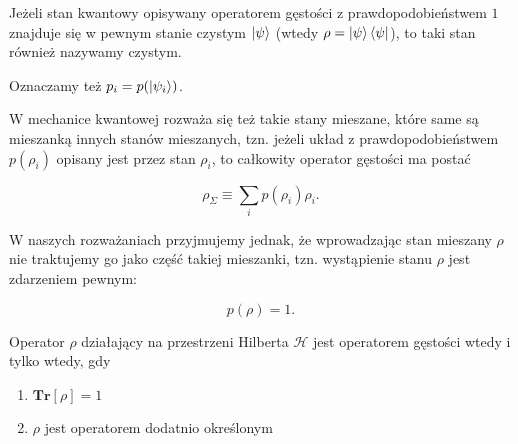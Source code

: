 \begin{remark}
    Jeżeli stan kwantowy opisywany operatorem gęstości z prawdopodobieństwem $1$ znajduje się w pewnym stanie czystym $\ket{\psi}$ (wtedy $\rho = \ket{\psi} \bra{\psi}$), to taki stan również nazywamy czystym.
\end{remark}

\begin{remark}
    Oznaczamy też $ p_i = p(\ket{\psi_i})$.
\end{remark}

\begin{remark}
    W mechanice kwantowej rozważa się też takie stany mieszane, które same są mieszanką innych stanów mieszanych, tzn. jeżeli układ z prawdopodobieństwem $p(\rho_i)$ opisany jest przez stan $\rho_i$, to całkowity operator gęstości ma postać

    $$
        \rho_\Sigma \equiv \sum\limits_{i} p(\rho_i) \rho_i.
    $$

    W naszych rozważaniach przyjmujemy jednak, że wprowadzając stan mieszany $\rho$ nie traktujemy go jako część takiej mieszanki, tzn. wystąpienie stanu $\rho$ jest zdarzeniem pewnym: 

    $$
        p(\rho) = 1.
    $$
\end{remark}

\begin{theorem}
    \label{theorem:characterization}
    Operator $\rho$ działający na przestrzeni Hilberta $\mathcal{H}$ jest operatorem gęstości wtedy i tylko wtedy, gdy

    \begin{enumerate}
        \item $\textbf{Tr}[\rho] = 1$
        \item $\rho$ jest operatorem dodatnio określonym
    \end{enumerate}
\end{theorem}

